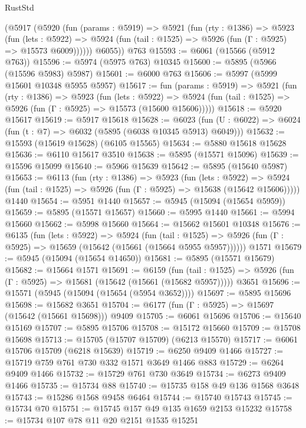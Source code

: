 \begin{lexlean}{RustStd}
\begin{coremodule}
{{      (@5917
        (@5920
          (fun (params : @5919) =>
          @5921
            (fun (rty : @1386) =>
            @5923
              (fun (lets : @5922) =>
              @5924 (fun (tail : @1525) => @5926 (fun (Γ : @5925) => @15573 @6009))))))
        @6055))
    @763
@15593 := @6061 (@15566 (@5912 @763))
@15596 := @5974 (@5975 @763) @10345
@15600 := @5895 (@5966 (@15596 @5983) @5987)
@15601 := @6000 @763
@15606 := @5997 (@5999 @15601 @10348 @5955 @5957)
@15617 := fun (params : @5919) =>
  @5921
    (fun (rty : @1386) =>
    @5923
      (fun (lets : @5922) =>
      @5924 (fun (tail : @1525) => @5926 (fun (Γ : @5925) => @15573 (@15600 @15606)))))
@15618 := @5920 @15617
@15619 := @5917 @15618
@15628 := @6023
    (fun (U : @6022) => @6024 (fun (t : @7) => @6032 (@5895 (@6038 @10345 @5913) @6049)))
@15632 := @15593 (@15619 @15628) (@6105 @15565)
@15634 := @5880 @15618 @15628
@15636 := @6110 @15617 @3510
@15638 := @5895 (@15571 @15096)
@15639 := @15596 @15099
@15640 := @5966 @15639
@15642 := @5895 (@15640 @5987)
@15653 := @6113
    (fun (rty : @1386) =>
    @5923
      (fun (lets : @5922) =>
      @5924 (fun (tail : @1525) => @5926 (fun (Γ : @5925) => @15638 (@15642 @15606)))))
    @1440
@15654 := @5951 @1440
@15657 := @5945 (@15094 (@15654 @5959))
@15659 := @5895 (@15571 @15657)
@15660 := @5995 @1440
@15661 := @5994 @15660
@15662 := @5998 @15660
@15664 := @15662 @15601 @10348
@15676 := @6135
    (fun (lets : @5922) =>
    @5924
      (fun (tail : @1525) =>
      @5926 (fun (Γ : @5925) => @15659 (@15642 (@15661 (@15664 @5955 @5957))))))
    @1571
@15679 := @5945 (@15094 (@15654 @14650))
@15681 := @5895 (@15571 @15679)
@15682 := @15664 @1571
@15691 := @6159
    (fun (tail : @1525) => @5926 (fun (Γ : @5925) => @15681 (@15642 (@15661 (@15682 @5957)))))
    @3651
@15696 := @15571 (@5945 (@15094 (@15654 (@5954 @3652))))
@15697 := @5895 @15696
@15698 := @15682 @3651
@15704 := @6177 (fun (Γ : @5925) => @15697 (@15642 (@15661 @15698))) @9409
@15705 := @6061 @15696
@15706 := @15640 @15169
@15707 := @5895 @15706
@15708 := @15172 @15660
@15709 := @15708 @15698
@15713 := @15705 (@15707 @15709) (@6213 @15570)
@15717 := @6061 @15706 @15709 (@6218 @15639)
@15719 := @6250 @9409 @1466
@15727 := @15719 @759 @761 @730 @332 @1571 @3649 @1466 @883
@15729 := @6264 @9409 @1466
@15732 := @15729 @761 @730 @3649
@15734 := @6273 @9409 @1466
@15735 := @15734 @88
@15740 := @15735 @158 @49 @136 @1568 @3648
@15743 := @15286 @1568 @9458 @6464
@15744 := @15740 @15743
@15745 := @15734 @70
@15751 := @15745 @157 @49 @135 @1659 @2153 @15232
@15758 := @15734 @107 @78 @11 @20 @2151 @1535 @15251
}}
\end{coremodule}
\end{lexlean}
